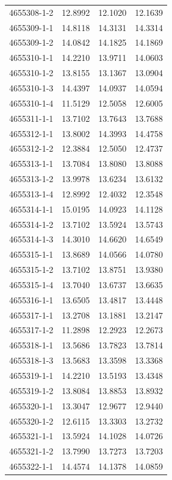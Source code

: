 \begin{longtable}{lrrr}
4655308-1-2 & 12.8992 & 12.1020 & 12.1639 \\
4655309-1-1 & 14.8118 & 14.3131 & 14.3314 \\
4655309-1-2 & 14.0842 & 14.1825 & 14.1869 \\
4655310-1-1 & 14.2210 & 13.9711 & 14.0603 \\
4655310-1-2 & 13.8155 & 13.1367 & 13.0904 \\
4655310-1-3 & 14.4397 & 14.0937 & 14.0594 \\
4655310-1-4 & 11.5129 & 12.5058 & 12.6005 \\
4655311-1-1 & 13.7102 & 13.7643 & 13.7688 \\
4655312-1-1 & 13.8002 & 14.3993 & 14.4758 \\
4655312-1-2 & 12.3884 & 12.5050 & 12.4737 \\
4655313-1-1 & 13.7084 & 13.8080 & 13.8088 \\
4655313-1-2 & 13.9978 & 13.6234 & 13.6132 \\
4655313-1-4 & 12.8992 & 12.4032 & 12.3548 \\
4655314-1-1 & 15.0195 & 14.0923 & 14.1128 \\
4655314-1-2 & 13.7102 & 13.5924 & 13.5743 \\
4655314-1-3 & 14.3010 & 14.6620 & 14.6549 \\
4655315-1-1 & 13.8689 & 14.0566 & 14.0780 \\
4655315-1-2 & 13.7102 & 13.8751 & 13.9380 \\
4655315-1-4 & 13.7040 & 13.6737 & 13.6635 \\
4655316-1-1 & 13.6505 & 13.4817 & 13.4448 \\
4655317-1-1 & 13.2708 & 13.1881 & 13.2147 \\
4655317-1-2 & 11.2898 & 12.2923 & 12.2673 \\
4655318-1-1 & 13.5686 & 13.7823 & 13.7814 \\
4655318-1-3 & 13.5683 & 13.3598 & 13.3368 \\
4655319-1-1 & 14.2210 & 13.5193 & 13.4348 \\
4655319-1-2 & 13.8084 & 13.8853 & 13.8932 \\
4655320-1-1 & 13.3047 & 12.9677 & 12.9440 \\
4655320-1-2 & 12.6115 & 13.3303 & 13.2732 \\
4655321-1-1 & 13.5924 & 14.1028 & 14.0726 \\
4655321-1-2 & 13.7990 & 13.7273 & 13.7203 \\
4655322-1-1 & 14.4574 & 14.1378 & 14.0859 \\

\end{longtable}
